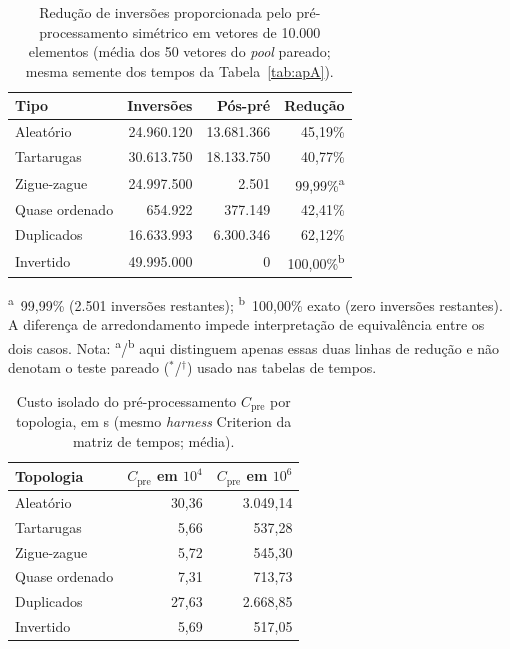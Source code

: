 \documentclass[12pt]{article}
\begin{document}
\begin{table}[H]
\centering
\caption{Redução de inversões proporcionada pelo pré-processamento simétrico em vetores de 10.000 elementos (média dos 50 vetores do \emph{pool} pareado; mesma semente dos tempos da Tabela~\ref{tab:apA}).}
\label{tab:inversoes}
\footnotesize
\begin{tabular}{lrrr}
\hline
\textbf{Tipo} & \textbf{Inversões} & \textbf{Pós-pré} & \textbf{Redução} \\
\hline
Aleatório & 24.960.120 & 13.681.366 & 45,19\% \\
Tartarugas & 30.613.750 & 18.133.750 & 40,77\% \\
Zigue-zague & 24.997.500 & 2.501 & 99,99\%\textsuperscript{a} \\
Quase ordenado & 654.922 & 377.149 & 42,41\% \\
Duplicados & 16.633.993 & 6.300.346 & 62,12\% \\
Invertido & 49.995.000 & 0 & 100,00\%\textsuperscript{b} \\
\hline
\end{tabular}
\par\vspace{2pt}
{\footnotesize\raggedright\textsuperscript{a}~99,99\% (2.501 inversões restantes); \textsuperscript{b}~100,00\% exato (zero inversões restantes). A diferença de arredondamento impede interpretação de equivalência entre os dois casos. Nota: \textsuperscript{a}/\textsuperscript{b} aqui distinguem apenas essas duas linhas de redução e não denotam o teste pareado ($^{*}$/$^{\dagger}$) usado nas tabelas de tempos.\par}
\end{table}

\begin{table}[htbp]
\centering
\caption{Custo isolado do pré-processamento $C_{\text{pre}}$ por topologia, em \textmu{}s (mesmo \emph{harness} Criterion da matriz de tempos; média).}
\label{tab:cpre}
\footnotesize
\begin{tabular}{lrr}
\hline
\textbf{Topologia} & \textbf{$C_{\text{pre}}$ em $10^4$} & \textbf{$C_{\text{pre}}$ em $10^6$} \\
\hline
Aleatório & 30,36 & 3.049,14 \\
Tartarugas & 5,66 & 537,28 \\
Zigue-zague & 5,72 & 545,30 \\
Quase ordenado & 7,31 & 713,73 \\
Duplicados & 27,63 & 2.668,85 \\
Invertido & 5,69 & 517,05 \\
\hline
\end{tabular}
\end{table}
\end{document}
